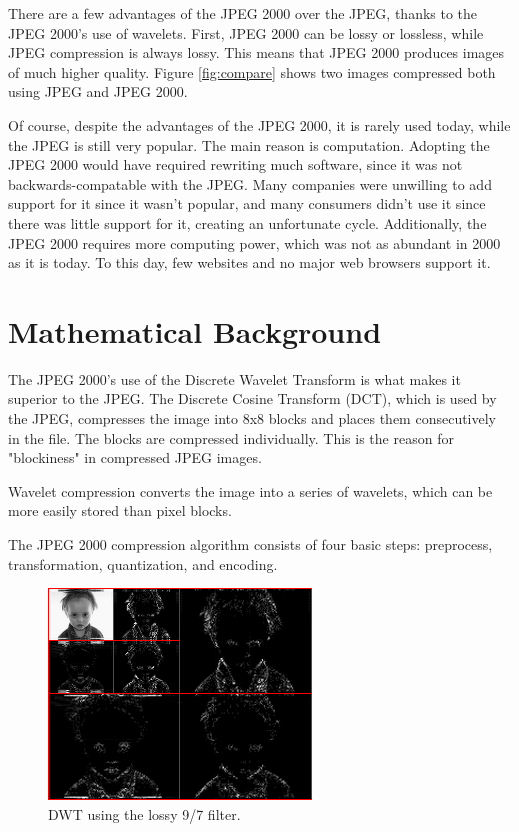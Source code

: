 \documentclass[12pt]{article}
\begin{document}
There are a few advantages of the JPEG 2000 over the JPEG,
thanks to the JPEG 2000's use of wavelets.
First, JPEG 2000 can be lossy or lossless, while JPEG compression is always lossy.
This means that JPEG 2000 produces images of much higher quality.
Figure \ref{fig:compare} shows two images compressed both using JPEG and JPEG 2000.

Of course, despite the advantages of the JPEG 2000, it is rarely used today, 
while the JPEG is still very popular.
The main reason is computation.\cite{alternative} 
Adopting the JPEG 2000 would have required rewriting much software, 
since it was not backwards-compatable with the JPEG.
Many companies were unwilling to add support for it since it wasn't popular,
and many consumers didn't use it since there was little support for it,
creating an unfortunate cycle. 
Additionally, the JPEG 2000 requires more computing power, which was not as abundant in 2000 as it is today.
To this day, few websites and no major web browsers support it.


\section{Mathematical Background}

The JPEG 2000's use of the Discrete Wavelet Transform is what makes it superior to the JPEG.\cite{how}
The Discrete Cosine Transform (DCT), which is used by the JPEG, compresses the image into 8x8 blocks
and places them consecutively in the file.
The blocks are compressed individually.
This is the reason for "blockiness" in compressed JPEG images.

Wavelet compression converts the image into a series of wavelets, which can be more easily stored than pixel blocks.

The JPEG 2000 compression algorithm consists of four basic steps: 
preprocess, transformation, quantization, and encoding\cite{whydomath}.

\begin{figure}[h]
	\centering
	\includegraphics[scale=0.6]{resources/lossybaby.png}
	\caption{DWT using the lossy 9/7 filter.}
	\label{fig:lossybaby}
\end{figure}
\end{document}
